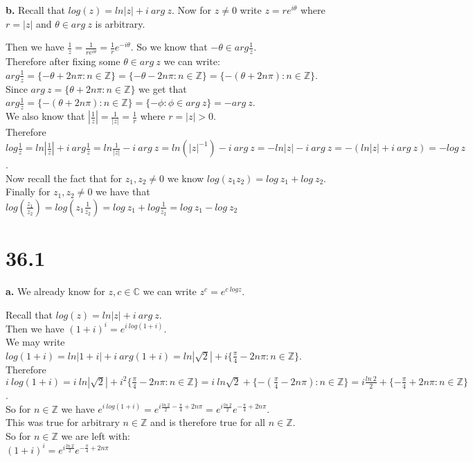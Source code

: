 \documentclass{article}
\begin{document}
{\Large\textbf{b.}} Recall that $log(z) = ln|z| + i\:arg\:z$. Now for $z\neq 0$ write $z = r e^{i\theta}$ where $r = |z|$ and $\theta\in arg\:z$ is arbitrary.
\begin{center}
    \doublespacing
    Then we have $\frac{1}{z} =\frac{1}{r e^{i\theta}} =\frac{1}{r} e^{-i\theta}$. So we know that $-\theta\in arg\frac{1}{z}$.
    \\Therefore after fixing some $\theta\in arg\:z$ we can write:
    \\$arg\frac{1}{z} =\{-\theta +2n\pi:n\in\mathbb{Z}\} =\{-\theta -2n\pi:n\in\mathbb{Z}\} =\{-(\theta +2n\pi):n\in\mathbb{Z}\}$.
    \\Since $arg\:z =\{\theta +2n\pi:n\in\mathbb{Z}\}$ we get that $arg\frac{1}{z} =\{-(\theta +2n\pi):n\in\mathbb{Z}\} =\{-\phi:\phi\in arg\:z\} = -arg\:z$.
    \\We also know that $|\frac{1}{z}| =\frac{1}{|z|} =\frac{1}{r}$ where $r = |z| > 0$.
    \\Therefore $log\frac{1}{z} = ln|\frac{1}{z}| + i\:arg\frac{1}{z} = ln\frac{1}{|z|} - i\:arg\:z = ln(|z|^{-1}) - i\:arg\:z = -ln|z| - i\:arg\:z = -(ln|z| + i\:arg\:z) = -log\:z$.
    \break
    \\Now recall the fact that for $z_1, z_2\neq 0$ we know $log(z_1 z_2) = log\:z_1 + log\:z_2$.
    \\Finally for $z_1, z_2\neq 0$ we have that $log(\frac{z_1}{z_2}) = log(z_1\frac{1}{z_2}) = log\:z_1 + log\frac{1}{z_2} = log\:z_1 - log\:z_2$ \qedsymbol
\end{center}


\section*{36.1}

{\Large\textbf{a.}} We already know for $z, c\in\mathbb{C}$ we can write $z^c = e^{c\:log z}$.
\begin{center}
    \doublespacing
    Recall that $log(z) = ln|z| + i\:arg\:z$.
    \\Then we have $(1 + i)^i = e^{i\:log(1 + i)}$.
    \break
    \\We may write $log(1 + i) = ln|1 + i| + i\:arg(1 + i) =ln|\sqrt{2}| + i\{\frac{\pi}{4} - 2n\pi:n\in\mathbb{Z}\}$.
    \\Therefore $i\:log(1 + i) = i\:ln|\sqrt{2}| + i^2\{\frac{\pi}{4} - 2n\pi:n\in\mathbb{Z}\} = i\:ln\sqrt{2} +\{-(\frac{\pi}{4} - 2n\pi):n\in\mathbb{Z}\} = i\frac{ln\:2}{2} +\{-\frac{\pi}{4} + 2n\pi:n\in\mathbb{Z}\}$.
    \\So for $n\in\mathbb{Z}$ we have $e^{i\:log(1 + i)} = e^{i\frac{ln\:2}{2} -\frac{\pi}{4} + 2n\pi} = e^{i\frac{ln\:2}{2}} e^{-\frac{\pi}{4} + 2n\pi}$.
    \break
    \\This was true for arbitrary $n\in\mathbb{Z}$ and is therefore true for all $n\in\mathbb{Z}$.
    \\So for $n\in\mathbb{Z}$ we are left with:
    \\$(1 + i)^i = e^{i\frac{ln\:2}{2}} e^{-\frac{\pi}{4} + 2n\pi}$ \qedsymbol
\end{center}
\end{document}
